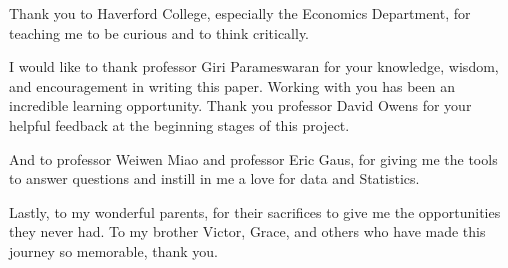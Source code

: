 \documentclass[12pt]{article}
\begin{document}
\begin{singlespace}
\begin{doublespace}
\begin{frame}{}
			\par \noindent
			Thank you to Haverford College, especially the Economics Department, for teaching me to be curious and to think critically.\\
			
			\par \noindent
			I would like to thank professor Giri Parameswaran for your knowledge, wisdom, and encouragement in writing this paper. Working with you has been an incredible learning opportunity. Thank you professor David Owens for your helpful feedback at the beginning stages of this project.\\
			
			\par \noindent
			And to professor Weiwen Miao and professor Eric Gaus, for giving me the tools to answer questions and instill in me a love for data and Statistics.\\
			
			\par \noindent
			Lastly, to my wonderful parents, for their sacrifices to give me the opportunities they never had. To my brother Victor, Grace, and others who have made this journey so memorable, thank you.
			
	
	\end{frame}
	\end{doublespace}
	\clearpage
	
	\tableofcontents %
	\clearpage
	
	\end{singlespace} %
	
\end{document}
